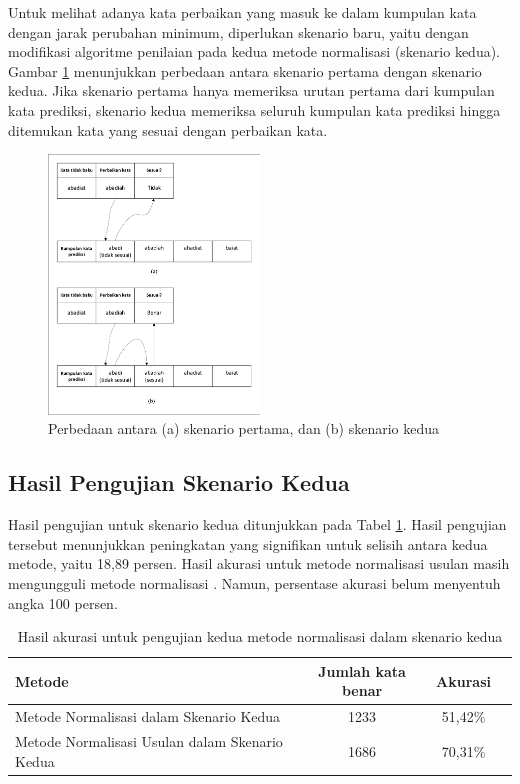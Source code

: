 Untuk melihat adanya kata perbaikan yang masuk ke dalam kumpulan kata dengan jarak perubahan minimum, diperlukan skenario baru, yaitu dengan modifikasi algoritme penilaian pada kedua metode normalisasi (skenario kedua). Gambar \ref{fig:skenario_side_to_side} menunjukkan perbedaan antara skenario pertama dengan skenario kedua. Jika skenario pertama hanya memeriksa urutan pertama dari kumpulan kata prediksi, skenario kedua memeriksa seluruh kumpulan kata prediksi hingga ditemukan kata yang sesuai dengan perbaikan kata.
\begin{figure}[ht]
	\centering
	\includegraphics[width=0.5\textwidth, trim=2 2 2 2, clip]{resources/4/skenario_side_to_side.pdf}
	\caption{Perbedaan antara (a) skenario pertama, dan (b) skenario kedua}
	\label{fig:skenario_side_to_side}
\end{figure}

\subsection{Hasil Pengujian Skenario Kedua}

Hasil pengujian untuk skenario kedua ditunjukkan pada Tabel \ref{tbl:result_2}. Hasil pengujian tersebut menunjukkan peningkatan yang signifikan untuk selisih antara kedua metode, yaitu 18,89 persen. Hasil akurasi untuk metode normalisasi usulan masih mengungguli metode normalisasi \parencite{saragih2017normalisasi}. Namun, persentase akurasi belum menyentuh angka 100 persen.
\begin{table}[ht]
    \captionsetup{justification=justified,singlelinecheck=false}
    \caption{Hasil akurasi untuk pengujian kedua metode normalisasi dalam skenario kedua}
    \label{tbl:result_2}
    \centering
    \begin{tabularx}{\textwidth}{|X|c|c|c|}
        \hline
        \multicolumn{1}{|Y|}{\textbf{Metode}} & \textbf{Jumlah kata benar} & \textbf{Akurasi} \\ \hline
        Metode Normalisasi \parencite{saragih2017normalisasi} dalam Skenario Kedua & 1233 & 51,42\% \\ \hline
        Metode Normalisasi Usulan dalam Skenario Kedua & 1686 & 70,31\% \\ \hline
    \end{tabularx}
\end{table}

